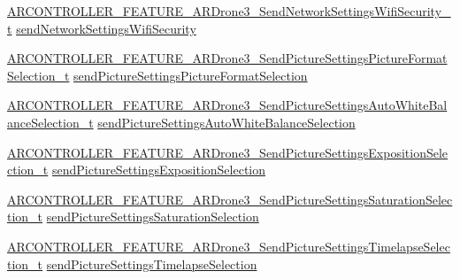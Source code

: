 \begin{DoxyCompactItemize}
\item 
\hyperlink{_a_r_c_o_n_t_r_o_l_l_e_r___feature_8h_a0f91d95dbe0a52a4aef08b46ca43cafc}{A\+R\+C\+O\+N\+T\+R\+O\+L\+L\+E\+R\+\_\+\+F\+E\+A\+T\+U\+R\+E\+\_\+\+A\+R\+Drone3\+\_\+\+Send\+Network\+Settings\+Wifi\+Security\+\_\+t} \hyperlink{struct_a_r_c_o_n_t_r_o_l_l_e_r___f_e_a_t_u_r_e___a_r_drone3__t_ad9f3c0045fd37db53aaffd24f7108702}{send\+Network\+Settings\+Wifi\+Security}
\item 
\hyperlink{_a_r_c_o_n_t_r_o_l_l_e_r___feature_8h_a4cdf406c08771cb3c7f058c57ac13d88}{A\+R\+C\+O\+N\+T\+R\+O\+L\+L\+E\+R\+\_\+\+F\+E\+A\+T\+U\+R\+E\+\_\+\+A\+R\+Drone3\+\_\+\+Send\+Picture\+Settings\+Picture\+Format\+Selection\+\_\+t} \hyperlink{struct_a_r_c_o_n_t_r_o_l_l_e_r___f_e_a_t_u_r_e___a_r_drone3__t_a8770c1ba7ddcd26a7c749fa8656cfe98}{send\+Picture\+Settings\+Picture\+Format\+Selection}
\item 
\hyperlink{_a_r_c_o_n_t_r_o_l_l_e_r___feature_8h_a99729d4e90e25f5b885e52562d2ea307}{A\+R\+C\+O\+N\+T\+R\+O\+L\+L\+E\+R\+\_\+\+F\+E\+A\+T\+U\+R\+E\+\_\+\+A\+R\+Drone3\+\_\+\+Send\+Picture\+Settings\+Auto\+White\+Balance\+Selection\+\_\+t} \hyperlink{struct_a_r_c_o_n_t_r_o_l_l_e_r___f_e_a_t_u_r_e___a_r_drone3__t_af7e33133651153503057b9df2fe091d1}{send\+Picture\+Settings\+Auto\+White\+Balance\+Selection}
\item 
\hyperlink{_a_r_c_o_n_t_r_o_l_l_e_r___feature_8h_a2b79d2f11d1f3135a6d1a2b91d7cbba1}{A\+R\+C\+O\+N\+T\+R\+O\+L\+L\+E\+R\+\_\+\+F\+E\+A\+T\+U\+R\+E\+\_\+\+A\+R\+Drone3\+\_\+\+Send\+Picture\+Settings\+Exposition\+Selection\+\_\+t} \hyperlink{struct_a_r_c_o_n_t_r_o_l_l_e_r___f_e_a_t_u_r_e___a_r_drone3__t_ac0155158ccfff7d4f2af19ae1ca55c81}{send\+Picture\+Settings\+Exposition\+Selection}
\item 
\hyperlink{_a_r_c_o_n_t_r_o_l_l_e_r___feature_8h_a2f318617cba1b320f5e3611b01b687a6}{A\+R\+C\+O\+N\+T\+R\+O\+L\+L\+E\+R\+\_\+\+F\+E\+A\+T\+U\+R\+E\+\_\+\+A\+R\+Drone3\+\_\+\+Send\+Picture\+Settings\+Saturation\+Selection\+\_\+t} \hyperlink{struct_a_r_c_o_n_t_r_o_l_l_e_r___f_e_a_t_u_r_e___a_r_drone3__t_aedcc2d7b4a0753ec11173df40faccf81}{send\+Picture\+Settings\+Saturation\+Selection}
\item 
\hyperlink{_a_r_c_o_n_t_r_o_l_l_e_r___feature_8h_a935cdbe8f4012b2a5be227c0abe1bd2e}{A\+R\+C\+O\+N\+T\+R\+O\+L\+L\+E\+R\+\_\+\+F\+E\+A\+T\+U\+R\+E\+\_\+\+A\+R\+Drone3\+\_\+\+Send\+Picture\+Settings\+Timelapse\+Selection\+\_\+t} \hyperlink{struct_a_r_c_o_n_t_r_o_l_l_e_r___f_e_a_t_u_r_e___a_r_drone3__t_ab31b5454a48ed41232bcc71d4345eab2}{send\+Picture\+Settings\+Timelapse\+Selection}

\end{DoxyCompactItemize}
